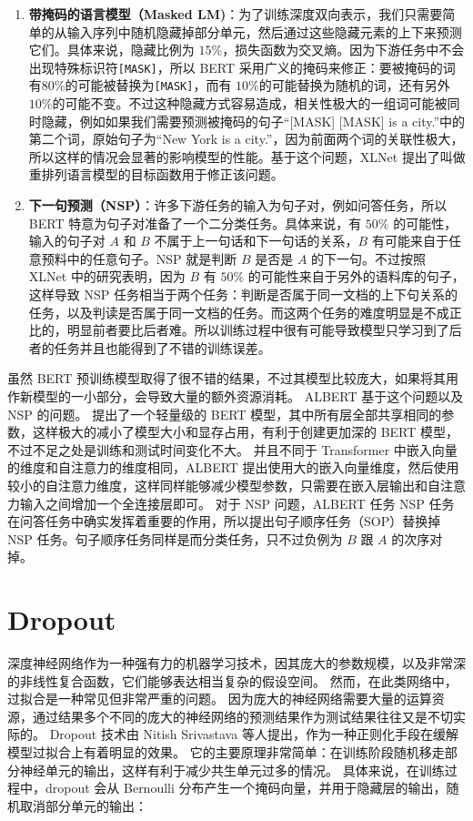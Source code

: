 \begin{enumerate}[(1)]
	\item \textbf{带掩码的语言模型（Masked LM)}：为了训练深度双向表示，我们只需要简单的从输入序列中随机隐藏掉部分单元，然后通过这些隐藏元素的上下来预测它们。具体来说，隐藏比例为 $15\%$，损失函数为交叉熵。因为下游任务中不会出现特殊标识符\texttt{[MASK]}，所以 BERT 采用广义的掩码来修正：要被掩码的词有$80\%$的可能被替换为\texttt{[MASK]}，而有 $10\%$的可能替换为随机的词，还有另外 $10\%$的可能不变。不过这种隐藏方式容易造成，相关性极大的一组词可能被同时隐藏，例如如果我们需要预测被掩码的句子“[MASK] [MASK] is a city.”中的第二个词，原始句子为“New York is a city.”，因为前面两个词的关联性极大，所以这样的情况会显著的影响模型的性能。基于这个问题，XLNet \cite{xlnet}提出了叫做重排列语言模型的目标函数用于修正该问题。
	\item \textbf{下一句预测（NSP）}：许多下游任务的输入为句子对，例如问答任务，所以 BERT 特意为句子对准备了一个二分类任务。具体来说，有 $50\%$ 的可能性，输入的句子对 $A$ 和 $B$ 不属于上一句话和下一句话的关系，$B$ 有可能来自于任意预料中的任意句子。NSP 就是判断 $B$ 是否是 $A$ 的下一句。不过按照 XLNet \cite{xlnet}中的研究表明，因为 $B$ 有 $50\%$ 的可能性来自于另外的语料库的句子，这样导致 NSP 任务相当于两个任务：判断是否属于同一文档的上下句关系的任务，以及判读是否属于同一文档的任务。而这两个任务的难度明显是不成正比的，明显前者要比后者难。所以训练过程中很有可能导致模型只学习到了后者的任务并且也能得到了不错的训练误差。
\end{enumerate}

虽然 BERT 预训练模型取得了很不错的结果，不过其模型比较庞大，如果将其用作新模型的一小部分，会导致大量的额外资源消耗。
ALBERT\cite{albert} 基于这个问题以及 NSP 的问题。
提出了一个轻量级的 BERT 模型，其中所有层全部共享相同的参数，这样极大的减小了模型大小和显存占用，有利于创建更加深的 BERT 模型，不过不足之处是训练和测试时间变化不大。
并且不同于 Transformer 中嵌入向量的维度和自注意力的维度相同，ALBERT 提出使用大的嵌入向量维度，然后使用较小的自注意力维度，这样同样能够减少模型参数，只需要在嵌入层输出和自注意力输入之间增加一个全连接层即可。
对于 NSP 问题，ALBERT 任务 NSP 任务在问答任务中确实发挥着重要的作用，所以提出句子顺序任务（SOP）替换掉 NSP 任务。句子顺序任务同样是而分类任务，只不过负例为 $B$ 跟 $A$ 的次序对掉。 

\section{Dropout}
深度神经网络作为一种强有力的机器学习技术，因其庞大的参数规模，以及非常深的非线性复合函数，它们能够表达相当复杂的假设空间。
然而，在此类网络中，过拟合是一种常见但非常严重的问题。
因为庞大的神经网络需要大量的运算资源，通过结果多个不同的庞大的神经网络的预测结果作为测试结果往往又是不切实际的。
Dropout\cite{dropout} 技术由 Nitish Srivastava 等人提出，作为一种正则化手段在缓解模型过拟合上有着明显的效果。
它的主要原理非常简单：在训练阶段随机移走部分神经单元的输出，这样有利于减少共生单元过多的情况。
具体来说，在训练过程中，dropout 会从 Bernoulli 分布产生一个掩码向量，并用于隐藏层的输出，随机取消部分单元的输出：

